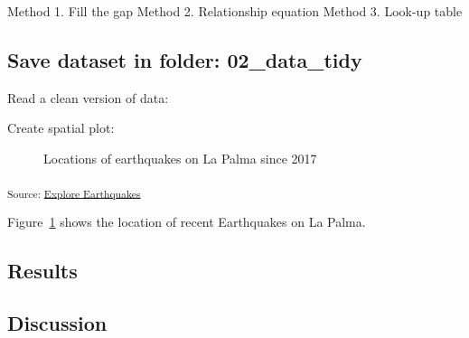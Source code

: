 \documentclass[
]{agujournal2019}
\begin{document}
Method 1. Fill the gap Method 2. Relationship equation Method 3. Look-up
table

\subsection{Save dataset in folder:
02\_data\_tidy}\label{save-dataset-in-folder-02_data_tidy-1}

Read a clean version of data:

Create spatial plot:

\begin{figure}[H]


\caption{\label{fig-spatial-plot}Locations of earthquakes on La Palma
since 2017}

\end{figure}%

\textsubscript{Source:
\href{https://EmouAcademy.github.io/my-awesome-manuscripts/notebooks/01-earthquakes-preview.html\#2671a8ae-4095-42b2-baed-da627795de37}{Explore
Earthquakes}}

Figure~\ref{fig-spatial-plot} shows the location of recent Earthquakes
on La Palma.

\subsection{Results}\label{sec-results}

\subsection{Discussion}\label{sec-discussion}
\end{document}
